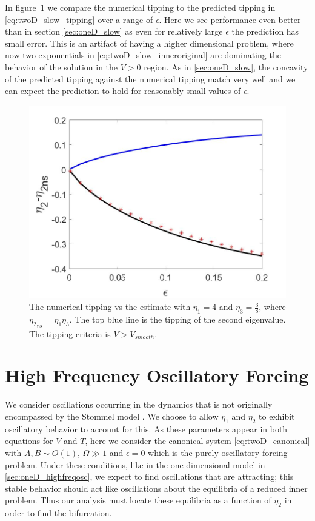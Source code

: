 In figure~\ref{fig:twoD_slow_epscomp} we compare the numerical tipping to the predicted tipping in \eqref{eq:twoD_slow_tipping} over a range of $\epsilon$. Here we see performance even better than in section \autoref{sec:oneD_slow} as even for relatively large $\epsilon$ the prediction has small error. This is an artifact of having a higher dimensional problem, where now two exponentials in \eqref{eq:twoD_slow_inneroriginal} are dominating the behavior of the solution in the $V>0$ region. As in \autoref{sec:oneD_slow}, the concavity of the predicted tipping against the numerical tipping match very well and we can expect the prediction to hold for reasonably small values of $\epsilon$.

\begin{figure}[H]
\centering
\includegraphics[width=\linewidth]{twoD/slow_epscomp.jpg}
\caption{The numerical tipping vs the estimate with $\eta_1=4$ and $\eta_3=\frac{3}{8}$, where ${\eta_2}_{\text{ns}}=\eta_1\eta_3$. The top blue line is the tipping of the second eigenvalue. The tipping criteria is $V>V_{smooth}$.}
\label{fig:twoD_slow_epscomp}
\end{figure}

\section{High Frequency Oscillatory Forcing}
\label{sec:twoD_highfreqosc}

We consider oscillations occurring in the dynamics that is not originally encompassed by the Stommel model \cite{alley2003abrupt,huybers2005obliquity,marotzke2000abrupt,rahmstorf2000thermohaline,rahmstorf2002ocean,stastna2007box}. We choose to allow $\eta_1$ and $\eta_2$ to exhibit oscillatory behavior to account for this. As these parameters appear in both equations for $V$ and $T$, here we consider the canonical system \eqref{eq:twoD_canonical} with $A,B\sim O(1)$, $\Omega\gg 1$ and $\epsilon=0$ which is the purely oscillatory forcing problem. Under these conditions, like in the one-dimensional model in \autoref{sec:oneD_highfreqosc}, we expect to find oscillations that are attracting; this stable behavior should act like oscillations about the equilibria of a reduced inner problem. Thus our analysis must locate these equilibria as a function of $\eta_2$ in order to find the bifurcation.

